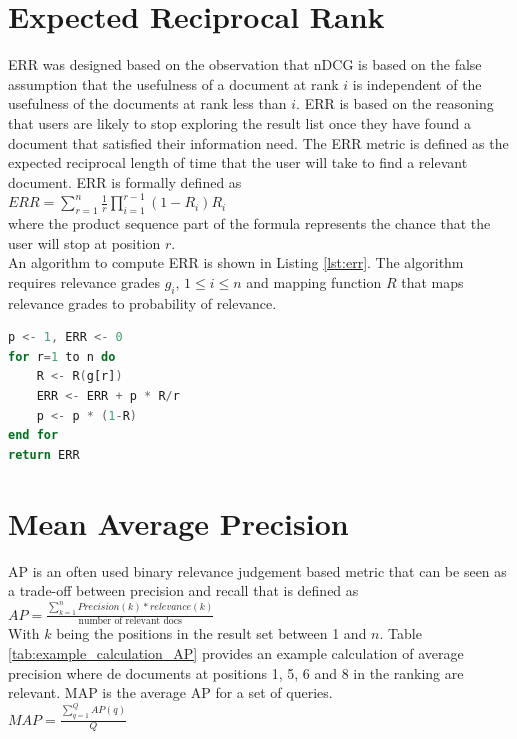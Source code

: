\section{Expected Reciprocal Rank}
\ac{ERR}\cite{Chapelle2009} was designed based on the observation that \ac{nDCG} is based on the false assumption that the usefulness of a document at rank $i$ is independent of the usefulness of the documents at rank less than $i$. \ac{ERR} is based on the reasoning that users are likely to stop exploring the result list once they have found a document that satisfied their information need. The \ac{ERR} metric is defined as the expected reciprocal length of time that the user will take to find a relevant document. \ac{ERR} is formally defined as\\
$ERR = \sum\nolimits_{r=1}^n \frac{1}{r} \prod\nolimits_{i=1}^{r-1}(1-R_i)R_i$\\
where the product sequence part of the formula represents the chance that the user will stop at position $r$.\\
An algorithm to compute \ac{ERR} is shown in Listing \ref{lst:err}. The algorithm requires relevance grades $g_i$, $1 \le i \le n$ and mapping function $R$ that maps relevance grades to probability of relevance.
\begin{lstlisting}[caption={Algorithm to compute the ERR metric, obtained from \cite{Chapelle2009}}, label={lst:err},language=Ada]
p <- 1, ERR <- 0
for r=1 to n do
	R <- R(g[r])
	ERR <- ERR + p * R/r
	p <- p * (1-R)
end for
return ERR
\end{lstlisting}
\section{Mean Average Precision}
\ac{AP}\cite{Zhu2004} is an often used binary relevance judgement based metric that can be seen as a trade-off between precision and recall that is defined as\\
$AP = \frac{\sum\nolimits_{k=1}^{n}Precision(k)*relevance(k)}{\text{number of relevant docs}}$\\
With $k$ being the positions in the result set between 1 and $n$. Table \ref{tab:example_calculation_AP} provides an example calculation of average precision where de documents at positions 1, 5, 6 and 8 in the ranking are relevant.
\ac{MAP} is the average \ac{AP} for a set of queries.\\
$MAP = \frac{\sum\nolimits_{q=1}^{Q}AP(q)}{Q}$

